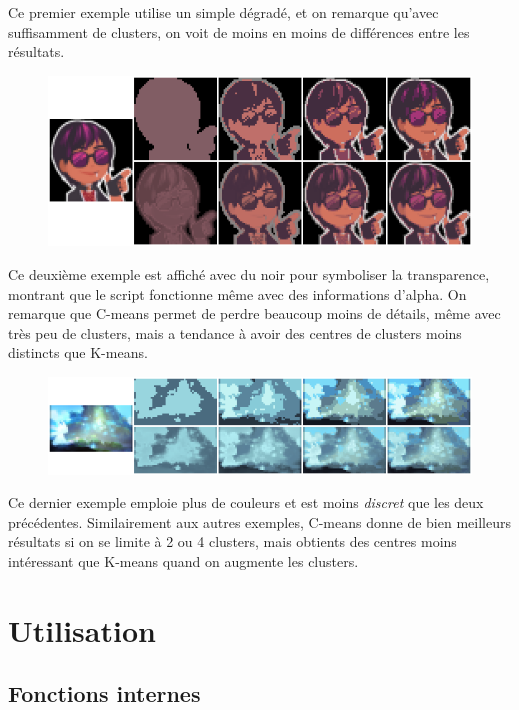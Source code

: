 \documentclass{article}
\begin{document}
  Ce premier exemple utilise un simple dégradé, et on remarque qu'avec suffisamment de clusters, on voit de moins en moins de différences entre les résultats.

  \begin{figure}[h]
    \centering
    \includegraphics[width=\textwidth]{images/concat_boss.png}
  \end{figure}

  \newpage
  Ce deuxième exemple est affiché avec du noir pour symboliser la transparence, montrant que le script fonctionne même avec des informations d'alpha. On remarque que C-means permet de perdre beaucoup moins de détails, même avec très peu de clusters, mais a tendance à avoir des centres de clusters moins distincts que K-means.

  \begin{figure}[h]
    \centering
    \includegraphics[width=\textwidth]{images/concat_test.png}
  \end{figure}

  Ce dernier exemple emploie plus de couleurs et est moins \textit{discret} que les deux précédentes. Similairement aux autres exemples, C-means donne de bien meilleurs résultats si on se limite à 2 ou 4 clusters, mais obtients des centres moins intéressant que K-means quand on augmente les clusters.

  \newpage
  \section{Utilisation}
    \subsection{Fonctions internes}
\end{document}

